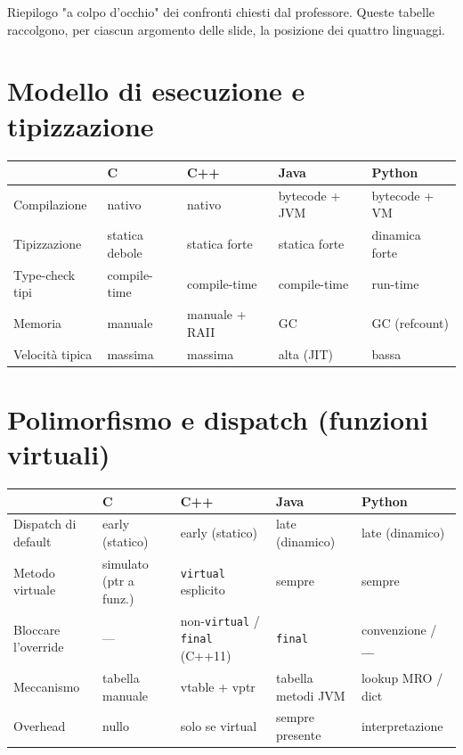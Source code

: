 \documentclass{report}
\newcommand{\code}[1]{\texttt{\small #1}}
\begin{document}
Riepilogo "a colpo d'occhio" dei confronti chiesti dal professore. Queste
tabelle raccolgono, per ciascun argomento delle slide, la posizione dei quattro
linguaggi.

\section{Modello di esecuzione e tipizzazione}

\begin{center}
\renewcommand{\arraystretch}{1.35}
\footnotesize
\begin{tabular}{|>{\raggedright\arraybackslash}p{3.0cm}|>{\raggedright\arraybackslash}p{2.4cm}|>{\raggedright\arraybackslash}p{2.7cm}|>{\raggedright\arraybackslash}p{2.4cm}|>{\raggedright\arraybackslash}p{2.4cm}|}
\hline
 & \textbf{C} & \textbf{C++} & \textbf{Java} & \textbf{Python} \\
\hline
Compilazione & nativo & nativo & bytecode + JVM & bytecode + VM \\
\hline
Tipizzazione & statica debole & statica forte & statica forte & dinamica forte \\
\hline
Type-check tipi & compile-time & compile-time & compile-time & run-time \\
\hline
Memoria & manuale & manuale + RAII & GC & GC (refcount) \\
\hline
Velocità tipica & massima & massima & alta (JIT) & bassa \\
\hline
\end{tabular}
\end{center}

\section{Polimorfismo e dispatch (funzioni virtuali)}

\begin{center}
\renewcommand{\arraystretch}{1.35}
\footnotesize
\begin{tabular}{|>{\raggedright\arraybackslash}p{3.2cm}|>{\raggedright\arraybackslash}p{2.3cm}|>{\raggedright\arraybackslash}p{2.6cm}|>{\raggedright\arraybackslash}p{2.4cm}|>{\raggedright\arraybackslash}p{2.4cm}|}
\hline
 & \textbf{C} & \textbf{C++} & \textbf{Java} & \textbf{Python} \\
\hline
Dispatch di default & early (statico) & early (statico) & late (dinamico) & late (dinamico) \\
\hline
Metodo virtuale & simulato (ptr a funz.) & \code{virtual} esplicito & sempre & sempre \\
\hline
Bloccare l'override & --- & non-\code{virtual} / \code{final} (C++11) & \code{final} & convenzione / \code{\_\_} \\
\hline
Meccanismo & tabella manuale & vtable + vptr & tabella metodi JVM & lookup MRO / dict \\
\hline
Overhead & nullo & solo se virtual & sempre presente & interpretazione \\
\hline
\end{tabular}
\end{center}
\end{document}
